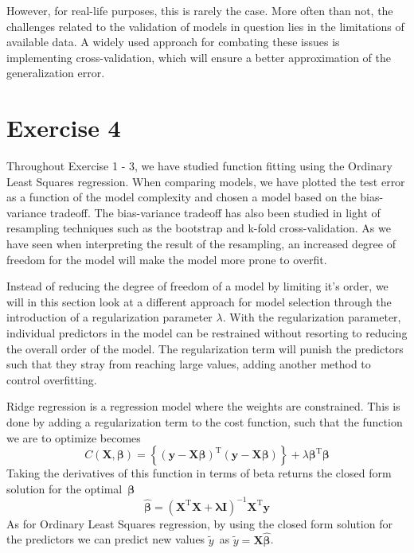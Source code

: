 \documentclass[11pt, a4paper]{article}
\begin{document}
However, for real-life purposes, this is rarely the case. More often than not, the challenges related to the validation of models in question lies in the limitations of available data.  A widely used approach for combating these issues is implementing cross-validation, which will ensure a better approximation of the generalization error. 



\section*{Exercise 4}
Throughout Exercise 1 - 3, we have studied function fitting using the Ordinary Least Squares regression. When comparing models, we have plotted the test error as a function of the model complexity and chosen a model based on the bias-variance tradeoff. The bias-variance tradeoff has also been studied in light of resampling techniques such as the bootstrap and k-fold cross-validation. As we have seen when interpreting the result of the resampling, an increased degree of freedom for the model will make the model more prone to overfit.

Instead of reducing the degree of freedom of a model by limiting it's order, we will in this section look at a different approach for model selection through the introduction of a regularization parameter $\lambda$. With the regularization parameter, individual predictors in the model can be restrained without resorting to reducing the overall order of the model. The regularization term will punish the predictors such that they stray from reaching large values, adding another method to control overfitting. \cite{Bishop2016}

Ridge regression is a regression model where the weights are constrained. \cite{Geron2019} This is done by adding a regularization term to the cost function, such that the function we are to optimize becomes
\[
  C\left(\bm{X},\bm{\beta}\right) = \left\{\left(\bm{y}-\bm{X}\bm{\beta}\right)^\text{T}\left(\bm{y}-\bm{X}\bm{\beta}\right)\right\}+\lambda\bm{\beta}^\text{T}\bm{\beta}
\]
Taking the derivatives of this function in terms of beta returns the closed form solution for the optimal $\bm{\beta}$
\[
  \bm{\hat{\beta}} = \left(\bm{X}^\text{T}\bm{X} + \bm{\lambda}\bm{I}\right)^{-1}\bm{X}^\text{T}\bm{y}
\]
As for Ordinary Least Squares regression, by using the closed form solution for the predictors we can predict new values $\tilde{y}$ as $\tilde{y} = \bm{X}\bm{\hat{\beta}}$.
\end{document}
